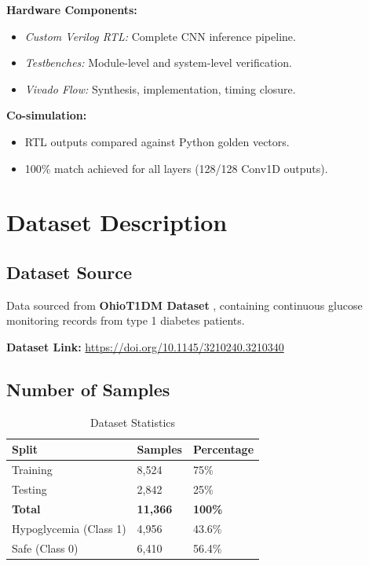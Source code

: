 \documentclass[11pt, a4paper]{article}
\begin{document}
\textbf{Hardware Components:}
\begin{itemize}
    \item \textit{Custom Verilog RTL:} Complete CNN inference pipeline.
    \item \textit{Testbenches:} Module-level and system-level verification.
    \item \textit{Vivado Flow:} Synthesis, implementation, timing closure.
\end{itemize}

\textbf{Co-simulation:}
\begin{itemize}
    \item RTL outputs compared against Python golden vectors.
    \item 100\% match achieved for all layers (128/128 Conv1D outputs).
\end{itemize}

\section{Dataset Description}

\subsection{Dataset Source}

Data sourced from \textbf{OhioT1DM Dataset} \cite{marling2018}, containing continuous glucose monitoring records from type 1 diabetes patients.

\textbf{Dataset Link:} \url{https://doi.org/10.1145/3210240.3210340}

\subsection{Number of Samples}

\begin{table}[H]
\centering
\caption{Dataset Statistics}
\label{tab:dataset_stats}
\begin{tabular}{@{}lll@{}}
\toprule
\textbf{Split} & \textbf{Samples} & \textbf{Percentage} \\ \midrule
Training & 8,524 & 75\% \\
Testing & 2,842 & 25\% \\
\textbf{Total} & \textbf{11,366} & \textbf{100\%} \\ \midrule
Hypoglycemia (Class 1) & 4,956 & 43.6\% \\
Safe (Class 0) & 6,410 & 56.4\% \\ \bottomrule
\end{tabular}
\end{table}
\end{document}
